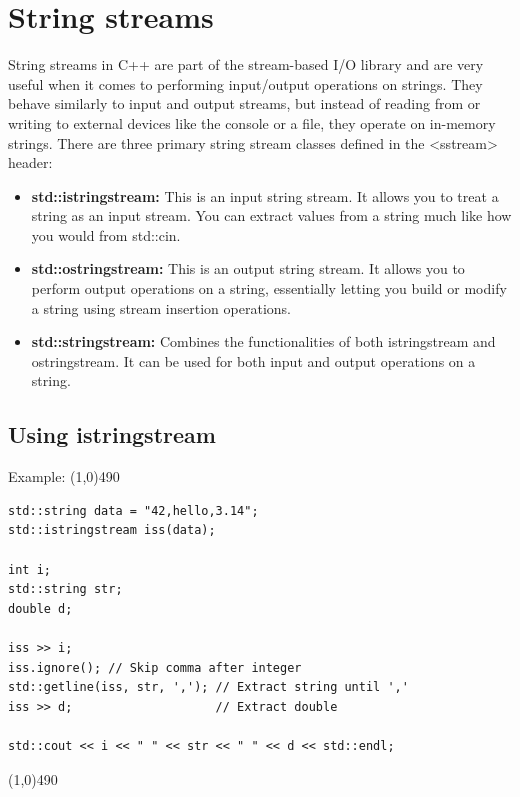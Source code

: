 \documentclass{report}
\begin{document}
        \pagebreak \bigbreak \noindent 
    \section{\LARGE String streams}
    \bigbreak \noindent 
     String streams in C++ are part of the stream-based I/O library and are very useful when it comes to performing input/output operations on strings. They behave similarly to input and output streams, but instead of reading from or writing to external devices like the console or a file, they operate on in-memory strings.
     \bigbreak \noindent 
     There are three primary string stream classes defined in the <sstream> header:
     \begin{itemize}
         \item \textbf{std::istringstream:} This is an input string stream. It allows you to treat a string as an input stream. You can extract values from a string much like how you would from std::cin.
         \item \textbf{std::ostringstream:} This is an output string stream. It allows you to perform output operations on a string, essentially letting you build or modify a string using stream insertion operations.
         \item \textbf{std::stringstream:} Combines the functionalities of both istringstream and ostringstream. It can be used for both input and output operations on a string.
     \end{itemize}

     \bigbreak \noindent 
     \subsection{Using istringstream}
     \bigbreak \noindent 
     Example:
     \bigbreak \noindent 
     \line(1,0){490}
     \begin{verbatim}
std::string data = "42,hello,3.14";
std::istringstream iss(data);

int i;
std::string str;
double d;

iss >> i;
iss.ignore(); // Skip comma after integer
std::getline(iss, str, ','); // Extract string until ','
iss >> d;                    // Extract double

std::cout << i << " " << str << " " << d << std::endl;
     \end{verbatim}
     \line(1,0){490}

     \bigbreak \noindent 
\end{document}
